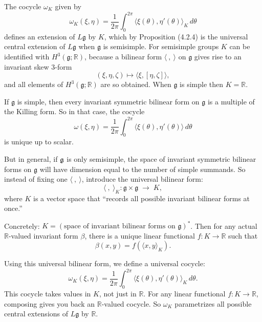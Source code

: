 \documentclass[12pt]{article}
\begin{document}
The cocycle $\omega_K$ given by
\begin{equation} \label{eq:4.2.7}
    \omega_K(\xi,\eta) = \frac{1}{2\pi} \int_0^{2\pi}
    \langle \xi(\theta), \eta'(\theta)\rangle_K \, d\theta
\end{equation}
defines an extension of $L\mathfrak{g}$ by $K$, which by Proposition (4.2.4) is the
universal central extension of $L\mathfrak{g}$ when $\mathfrak{g}$ is semisimple.
For semisimple groups $K$ can be identified with $H^3(\mathfrak{g};\mathbb{R})$,
because a bilinear form $\langle \ , \ \rangle$ on $\mathfrak{g}$ gives rise to an
invariant skew $3$-form
\[
    (\xi,\eta,\zeta) \mapsto \langle \xi,[\eta,\zeta]\rangle,
\]
and all elements of $H^3(\mathfrak{g};\mathbb{R})$ are so obtained. When $\mathfrak{g}$ is simple then $K = \mathbb{R}$.

\begin{remark}
    If $\mathfrak{g}$ is simple, then every invariant symmetric bilinear form on $\mathfrak{g}$ is a multiple of the Killing form. So in that case, the cocycle
    \[
        \omega(\xi,\eta) = \frac{1}{2\pi}\int_0^{2\pi} \langle \xi(\theta), \eta'(\theta)\rangle \, d\theta
    \]
    is unique up to scalar.

    But in general, if $\mathfrak{g}$ is only semisimple, the space of invariant symmetric bilinear forms on $\mathfrak{g}$ will have dimension equal to the number of simple summands. So instead of fixing one $\langle\ ,\ \rangle$, introduce the universal bilinear form:
    \[
        \langle\ ,\ \rangle_K : \mathfrak{g} \times \mathfrak{g} \;\to\; K,
    \]
    where $K$ is a vector space that “records all possible invariant bilinear forms at once.”

    Concretely: $K = (\text{space of invariant bilinear forms on }\mathfrak{g})^*$.
    Then for any actual $\mathbb{R}$-valued invariant form $\beta$, there is a unique linear functional $f:K\to \mathbb{R}$ such that
    \[
        \beta(x,y) = f(\langle x,y\rangle_K).
    \]


    Using this universal bilinear form, we define a universal cocycle:
    \[
        \omega_K(\xi,\eta) = \frac{1}{2\pi}\int_0^{2\pi} \langle \xi(\theta), \eta'(\theta)\rangle_K \, d\theta.
    \]
    This cocycle takes values in $K$, not just in $\mathbb{R}$. For any linear functional $f:K\to \mathbb{R}$, composing gives you back an $\mathbb{R}$-valued cocycle. So $\omega_K$ parametrizes all possible central extensions of $L\mathfrak{g}$ by $\mathbb{R}$.
\end{remark}
\end{document}
